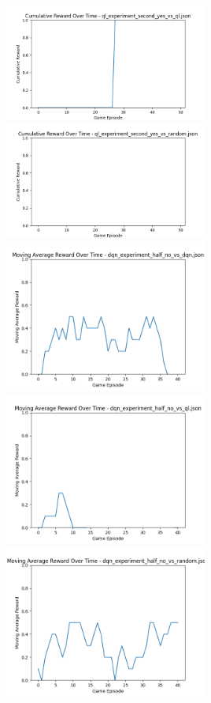 \includegraphics[width=0.5\textwidth]{images/cumulative_reward_ql_experiment_second_yes_vs_ql.png} 
\includegraphics[width=0.5\textwidth]{images/cumulative_reward_ql_experiment_second_yes_vs_random.png} 
\includegraphics[width=0.5\textwidth]{images/moving_average_reward_dqn_experiment_half_no_vs_dqn.png} 
\includegraphics[width=0.5\textwidth]{images/moving_average_reward_dqn_experiment_half_no_vs_ql.png} 
\includegraphics[width=0.5\textwidth]{images/moving_average_reward_dqn_experiment_half_no_vs_random.png} 
